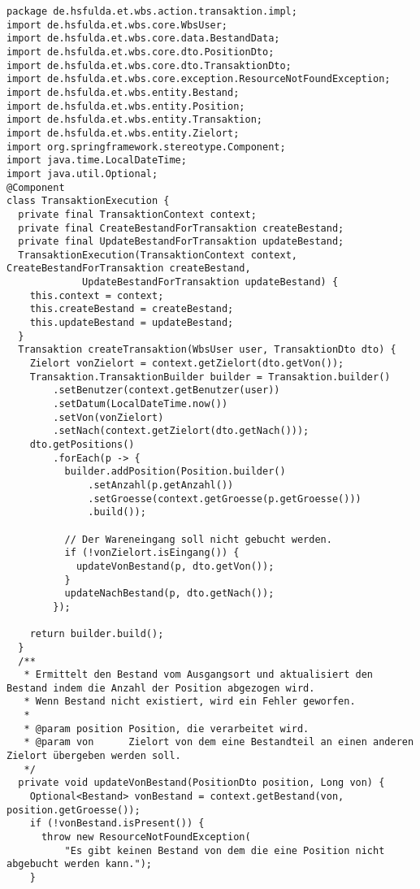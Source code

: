 \begin{lstlisting}[caption={Speicherung einer neuen Transaktion.}, label={lst:TransaktionExecution}]
package de.hsfulda.et.wbs.action.transaktion.impl;
import de.hsfulda.et.wbs.core.WbsUser;
import de.hsfulda.et.wbs.core.data.BestandData;
import de.hsfulda.et.wbs.core.dto.PositionDto;
import de.hsfulda.et.wbs.core.dto.TransaktionDto;
import de.hsfulda.et.wbs.core.exception.ResourceNotFoundException;
import de.hsfulda.et.wbs.entity.Bestand;
import de.hsfulda.et.wbs.entity.Position;
import de.hsfulda.et.wbs.entity.Transaktion;
import de.hsfulda.et.wbs.entity.Zielort;
import org.springframework.stereotype.Component;
import java.time.LocalDateTime;
import java.util.Optional;
@Component
class TransaktionExecution {
  private final TransaktionContext context;
  private final CreateBestandForTransaktion createBestand;
  private final UpdateBestandForTransaktion updateBestand;
  TransaktionExecution(TransaktionContext context, CreateBestandForTransaktion createBestand,
             UpdateBestandForTransaktion updateBestand) {
    this.context = context;
    this.createBestand = createBestand;
    this.updateBestand = updateBestand;
  }
  Transaktion createTransaktion(WbsUser user, TransaktionDto dto) {
    Zielort vonZielort = context.getZielort(dto.getVon());
    Transaktion.TransaktionBuilder builder = Transaktion.builder()
        .setBenutzer(context.getBenutzer(user))
        .setDatum(LocalDateTime.now())
        .setVon(vonZielort)
        .setNach(context.getZielort(dto.getNach()));
    dto.getPositions()
        .forEach(p -> {
          builder.addPosition(Position.builder()
              .setAnzahl(p.getAnzahl())
              .setGroesse(context.getGroesse(p.getGroesse()))
              .build());

          // Der Wareneingang soll nicht gebucht werden.
          if (!vonZielort.isEingang()) {
            updateVonBestand(p, dto.getVon());
          }
          updateNachBestand(p, dto.getNach());
        });

    return builder.build();
  }
  /**
   * Ermittelt den Bestand vom Ausgangsort und aktualisiert den Bestand indem die Anzahl der Position abgezogen wird.
   * Wenn Bestand nicht existiert, wird ein Fehler geworfen.
   *
   * @param position Position, die verarbeitet wird.
   * @param von      Zielort von dem eine Bestandteil an einen anderen Zielort übergeben werden soll.
   */
  private void updateVonBestand(PositionDto position, Long von) {
    Optional<Bestand> vonBestand = context.getBestand(von, position.getGroesse());
    if (!vonBestand.isPresent()) {
      throw new ResourceNotFoundException(
          "Es gibt keinen Bestand von dem die eine Position nicht abgebucht werden kann.");
    }


\end{lstlisting}
